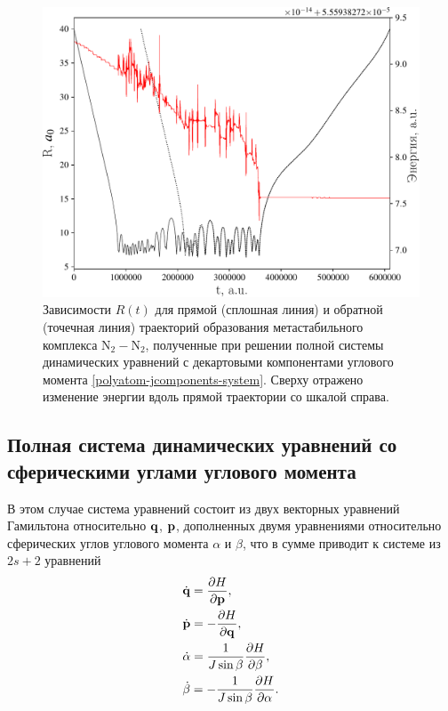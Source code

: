 \begin{figure}[H]
    \centering
    \includegraphics[width=0.75\linewidth]{./pictures/trajectories/jcomponents-trajectory-crop.pdf}
    \caption{Зависимости $R(t)$ для прямой (сплошная линия) и обратной (точечная линия) траекторий образования метастабильного комплекса N$_2-$N$_2$, полученные при решении полной системы динамических уравнений с декартовыми компонентами углового момента \eqref{polyatom-jcomponents-system}. Сверху отражено изменение энергии вдоль прямой траектории со шкалой справа.}
    \label{fig:jcomponents-trajectory}
\end{figure}


\subsection{Полная система динамических уравнений со сферическими углами углового момента}
В этом случае система уравнений состоит из двух векторных уравнений Гамильтона относительно $\mathbf{q}$, $\mathbf{p}$, дополненных двумя уравнениями относительно сферических углов углового момента $\alpha$ и $\beta$, что в сумме приводит к системе из $2s + 2$ уравнений
\begin{gather}
    \begin{aligned}
        &\dot{\mathbf{q}} = \frac{\partial H}{\partial \mathbf{p}}, \\
        &\dot{\mathbf{p}} = -\frac{\partial H}{\partial \mathbf{q}}, \\
        &\dot{\alpha} = \frac{1}{J \sin \beta} \frac{\partial H}{\partial \beta}, \\
        &\dot{\beta} = -\frac{1}{J \sin \beta} \frac{\partial H}{\partial \alpha}.
    \end{aligned}
\end{gather}

